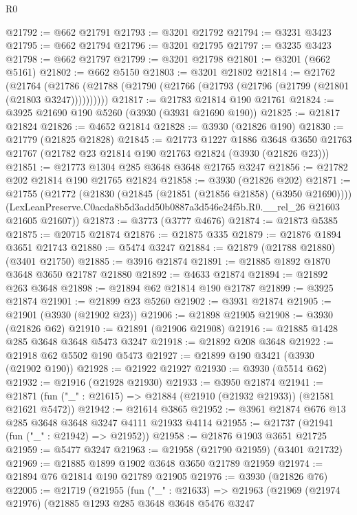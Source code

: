 \begin{lexlean}{R0}
\begin{coremodule}
@21792 := @662 @21791
@21793 := @3201 @21792
@21794 := @3231 @3423
@21795 := @662 @21794
@21796 := @3201 @21795
@21797 := @3235 @3423
@21798 := @662 @21797
@21799 := @3201 @21798
@21801 := @3201 (@662 @5161)
@21802 := @662 @5150
@21803 := @3201 @21802
@21814 := @21762
    (@21764 (@21786 (@21788 (@21790 (@21766 (@21793 (@21796 (@21799 (@21801 (@21803 @3247))))))))))
@21817 := @21783 @21814 @190 @21761
@21824 := @3925 @21690 @190 @5260 (@3930 (@3931 @21690 @190))
@21825 := @21817 @21824
@21826 := @4652 @21814
@21828 := @3930 (@21826 @190)
@21830 := @21779 (@21825 @21828)
@21845 := @21773
    @1227
    @1886
    @3648
    @3650
    @21763
    @21767
    (@21782 @23 @21814 @190 @21763 @21824 (@3930 (@21826 @23)))
@21851 := @21773 @1304 @285 @3648 @3648 @21765 @3247
@21856 := @21782 @202 @21814 @190 @21765 @21824
@21858 := @3930 (@21826 @202)
@21871 := @21755
    (@21772
      (@21830 (@21845 (@21851 (@21856 @21858) (@3950 @21690))))
      (LexLeanPreserve.C0acda8b5d3add50b0887a3d546e24f5b.R0.__rel_26 @21603 @21605 @21607))
@21873 := @3773 (@3777 @4676)
@21874 := @21873 @5385
@21875 := @20715 @21874
@21876 := @21875 @335
@21879 := @21876 @1894 @3651 @21743
@21880 := @5474 @3247
@21884 := @21879 (@21788 @21880) (@3401 @21750)
@21885 := @3916 @21874
@21891 := @21885 @1892 @1870 @3648 @3650 @21787 @21880
@21892 := @4633 @21874
@21894 := @21892 @263 @3648
@21898 := @21894 @62 @21814 @190 @21787
@21899 := @3925 @21874
@21901 := @21899 @23 @5260
@21902 := @3931 @21874
@21905 := @21901 (@3930 (@21902 @23))
@21906 := @21898 @21905
@21908 := @3930 (@21826 @62)
@21910 := @21891 (@21906 @21908)
@21916 := @21885 @1428 @285 @3648 @3648 @5473 @3247
@21918 := @21892 @208 @3648
@21922 := @21918 @62 @5502 @190 @5473
@21927 := @21899 @190 @3421 (@3930 (@21902 @190))
@21928 := @21922 @21927
@21930 := @3930 (@5514 @62)
@21932 := @21916 (@21928 @21930)
@21933 := @3950 @21874
@21941 := @21871 (fun ("_" : @21615) => @21884 (@21910 (@21932 @21933)) (@21581 @21621 @5472))
@21942 := @21614 @3865
@21952 := @3961 @21874 @676 @13 @285 @3648 @3648 @3247 @4111 @21933 @4114
@21955 := @21737 (@21941 (fun ("_" : @21942) => @21952))
@21958 := @21876 @1903 @3651 @21725
@21959 := @5477 @3247
@21963 := @21958 (@21790 @21959) (@3401 @21732)
@21969 := @21885 @1899 @1902 @3648 @3650 @21789 @21959
@21974 := @21894 @76 @21814 @190 @21789 @21905
@21976 := @3930 (@21826 @76)
@22005 := @21719
    (@21955
      (fun ("_" : @21633) =>
      @21963
        (@21969
          (@21974 @21976)
          (@21885
            @1293
            @285
            @3648
            @3648
            @5476
            @3247

\end{coremodule}
\end{lexlean}
